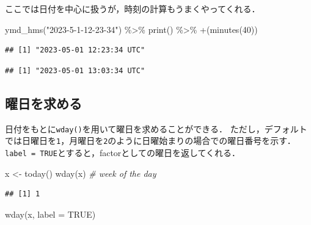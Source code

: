 \documentclass[
]{article}
\newenvironment{Shaded}{\begin{snugshade}}{\end{snugshade}}
\newcommand{\AttributeTok}[1]{\textcolor[rgb]{0.77,0.63,0.00}{#1}}
\newcommand{\CommentTok}[1]{\textcolor[rgb]{0.56,0.35,0.01}{\textit{#1}}}
\newcommand{\ConstantTok}[1]{\textcolor[rgb]{0.00,0.00,0.00}{#1}}
\newcommand{\DecValTok}[1]{\textcolor[rgb]{0.00,0.00,0.81}{#1}}
\newcommand{\FunctionTok}[1]{\textcolor[rgb]{0.00,0.00,0.00}{#1}}
\newcommand{\NormalTok}[1]{#1}
\newcommand{\OtherTok}[1]{\textcolor[rgb]{0.56,0.35,0.01}{#1}}
\newcommand{\SpecialCharTok}[1]{\textcolor[rgb]{0.00,0.00,0.00}{#1}}
\newcommand{\StringTok}[1]{\textcolor[rgb]{0.31,0.60,0.02}{#1}}
\begin{document}
ここでは日付を中心に扱うが，時刻の計算もうまくやってくれる．

\begin{Shaded}
\begin{Highlighting}[]
\FunctionTok{ymd\_hms}\NormalTok{(}\StringTok{"2023{-}5{-}1{-}12{-}23{-}34"}\NormalTok{) }\SpecialCharTok{\%\textgreater{}\%}
  \FunctionTok{print}\NormalTok{() }\SpecialCharTok{\%\textgreater{}\%}
  \StringTok{\textasciigrave{}}\AttributeTok{+}\StringTok{\textasciigrave{}}\NormalTok{(}\FunctionTok{minutes}\NormalTok{(}\DecValTok{40}\NormalTok{))}
\end{Highlighting}
\end{Shaded}

\begin{verbatim}
## [1] "2023-05-01 12:23:34 UTC"
\end{verbatim}

\begin{verbatim}
## [1] "2023-05-01 13:03:34 UTC"
\end{verbatim}

\hypertarget{ux66dcux65e5ux3092ux6c42ux3081ux308b}{%
\subsection{曜日を求める}\label{ux66dcux65e5ux3092ux6c42ux3081ux308b}}

日付をもとに\texttt{wday()}を用いて曜日を求めることができる．
ただし，デフォルトでは日曜日を\texttt{1}，月曜日を\texttt{2}のように日曜始まりの場合での曜日番号を示す．
\texttt{label\ =\ TRUE}とすると，factorとしての曜日を返してくれる．

\begin{Shaded}
\begin{Highlighting}[]
\NormalTok{x }\OtherTok{\textless{}{-}} \FunctionTok{today}\NormalTok{()}
\FunctionTok{wday}\NormalTok{(x) }\CommentTok{\# week of the day}
\end{Highlighting}
\end{Shaded}

\begin{verbatim}
## [1] 1
\end{verbatim}

\begin{Shaded}
\begin{Highlighting}[]
\FunctionTok{wday}\NormalTok{(x, }\AttributeTok{label =} \ConstantTok{TRUE}\NormalTok{)}
\end{Highlighting}
\end{Shaded}
\end{document}
